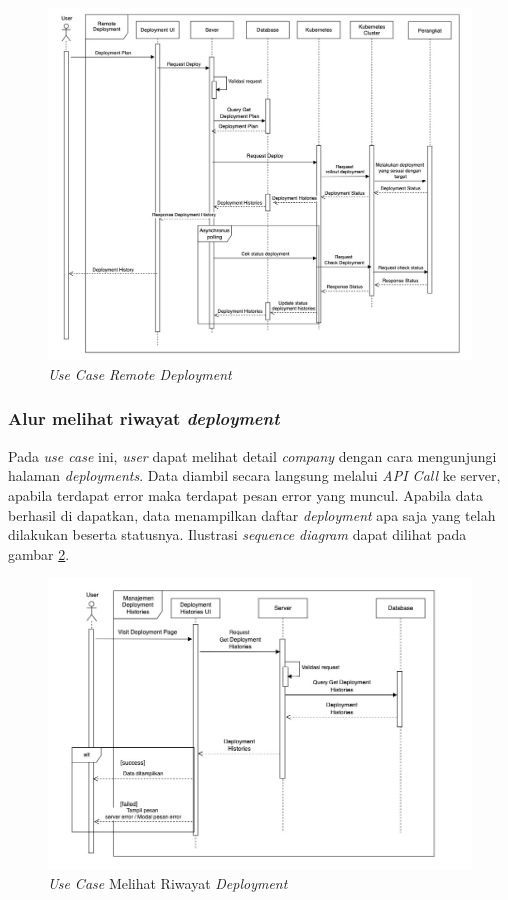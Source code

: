 \begin{figure}[ht]
  \centering
  \includegraphics[width=1\textwidth]{resources/chapter-3/usecase/uc-12.jpg}
  \caption{\textit{Use Case} \textit{Remote Deployment}}
  \label{fig:usecase-12}
\end{figure}

\pagebreak

\subsubsection{Alur melihat riwayat \textit{deployment}}

Pada \textit{use case} ini, \textit{user} dapat melihat detail \textit{company} dengan cara mengunjungi halaman \textit{deployments}. Data diambil secara langsung melalui \textit{API Call} ke server, apabila terdapat error maka terdapat pesan error yang muncul. Apabila data berhasil di dapatkan, data menampilkan daftar \textit{deployment} apa saja yang telah dilakukan beserta statusnya. Ilustrasi \textit{sequence diagram} dapat dilihat pada gambar \ref{fig:usecase-13}.

\begin{figure}[ht]
  \centering
  \includegraphics[width=1\textwidth]{resources/chapter-3/usecase/uc-13.jpg}
  \caption{\textit{Use Case} Melihat Riwayat \textit{Deployment}}
  \label{fig:usecase-13}
\end{figure}

\pagebreak